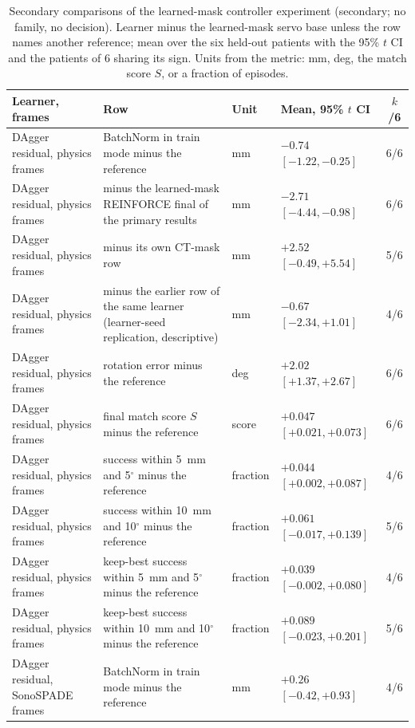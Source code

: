 
\begin{table}[tp]
\renewcommand{\baselinestretch}{1}\scriptsize
\caption{Secondary comparisons of the learned-mask controller experiment (secondary; no family, no decision). Learner minus the learned-mask servo base unless the row names another reference; mean over the six held-out patients with the 95\% $t$ CI and the patients of 6 sharing its sign. Units from the metric: mm, deg, the match score $S$, or a fraction of episodes.}
\label{tab:s11-arm-a-secondary}
\centering
\setlength{\tabcolsep}{3pt}
\begin{tabularx}{\textwidth}{@{}l >{\raggedright\arraybackslash}X l l c@{}}
\toprule
Learner, frames & Row & Unit & Mean, 95\% $t$ CI & $k$/6 \\
\midrule
DAgger residual, physics frames & BatchNorm in train mode minus the reference & mm & $-0.74$ $[-1.22, -0.25]$ & 6/6 \\
DAgger residual, physics frames & minus the learned-mask REINFORCE final of the primary results & mm & $-2.71$ $[-4.44, -0.98]$ & 6/6 \\
DAgger residual, physics frames & minus its own CT-mask row & mm & $+2.52$ $[-0.49, +5.54]$ & 5/6 \\
DAgger residual, physics frames & minus the earlier row of the same learner (learner-seed replication, descriptive) & mm & $-0.67$ $[-2.34, +1.01]$ & 4/6 \\
DAgger residual, physics frames & rotation error minus the reference & deg & $+2.02$ $[+1.37, +2.67]$ & 6/6 \\
DAgger residual, physics frames & final match score $S$ minus the reference & score & $+0.047$ $[+0.021, +0.073]$ & 6/6 \\
DAgger residual, physics frames & success within 5~mm and 5$^\circ$ minus the reference & fraction & $+0.044$ $[+0.002, +0.087]$ & 4/6 \\
DAgger residual, physics frames & success within 10~mm and 10$^\circ$ minus the reference & fraction & $+0.061$ $[-0.017, +0.139]$ & 5/6 \\
DAgger residual, physics frames & keep-best success within 5~mm and 5$^\circ$ minus the reference & fraction & $+0.039$ $[-0.002, +0.080]$ & 4/6 \\
DAgger residual, physics frames & keep-best success within 10~mm and 10$^\circ$ minus the reference & fraction & $+0.089$ $[-0.023, +0.201]$ & 5/6 \\
DAgger residual, SonoSPADE frames & BatchNorm in train mode minus the reference & mm & $+0.26$ $[-0.42, +0.93]$ & 4/6 \\

\end{tabularx}
\end{table}
